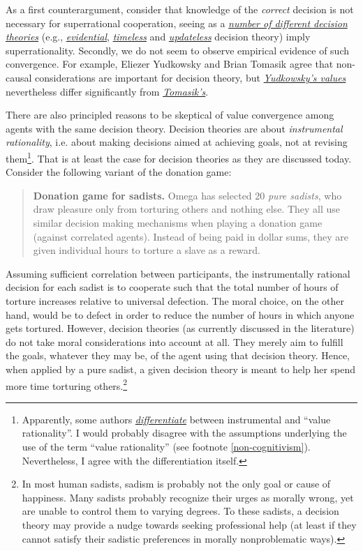 As a first counterargument, consider that knowledge of the
\emph{correct} decision is not necessary for superrational cooperation,
seeing as a
\href{https://casparoesterheld.com/a-comprehensive-list-of-decision-theories/}{\emph{number
of different decision theories}} (e.g.,
\href{https://en.wikipedia.org/wiki/Evidential_decision_theory}{\emph{evidential}},
\href{https://intelligence.org/files/TDT.pdf}{\emph{timeless}} and
\href{https://wiki.lesswrong.com/wiki/Updateless_decision_theory}{\emph{updateless}}
decision theory) imply superrationality. Secondly, we do not seem to
observe empirical evidence of such convergence. For example, Eliezer
Yudkowsky and Brian Tomasik agree that non-causal considerations are
important for decision theory, but
\href{https://wiki.lesswrong.com/wiki/Fun_theory}{\emph{Yudkowsky's
values}} nevertheless differ significantly from
\href{http://reducing-suffering.org/\#Ethics}{\emph{Tomasik's}}.

There are also principled reasons to be skeptical of value convergence
among agents with the same decision theory. Decision theories are about
\emph{instrumental rationality}, i.e. about making decisions aimed at
achieving goals, not at revising them\footnote{Apparently, some authors
  \href{https://en.wikipedia.org/wiki/Instrumental_and_value_rationality}{\emph{differentiate}}
  between instrumental and ``value rationality''. I would probably
  disagree with the assumptions underlying the use of the term ``value
  rationality'' (see footnote \ref{non-cognitivism}).
  Nevertheless, I agree with the differentiation itself.}. That is at
least the case for decision theories as they are discussed today.
Consider the following variant of the donation game:

\begin{quote}
\textbf{Donation game for sadists.} Omega has selected 20 \emph{pure
sadists}, who draw pleasure only from torturing others and nothing else.
They all use similar decision making mechanisms when playing a donation
game (against correlated agents). Instead of being paid in dollar sums,
they are given individual hours to torture a slave as a reward.
\end{quote}

Assuming sufficient correlation between participants, the instrumentally
rational decision for each sadist is to cooperate such that the total
number of hours of torture increases relative to universal defection.
The moral choice, on the other hand, would be to defect in order to
reduce the number of hours in which anyone gets tortured. However,
decision theories (as currently discussed in the literature) do not take
moral considerations into account at all. They merely aim to fulfill the
goals, whatever they may be, of the agent using that decision theory.
Hence, when applied by a pure sadist, a given decision theory is meant
to help her spend more time torturing others.\footnote{In most human
  sadists, sadism is probably not the only goal or cause of happiness.
  Many sadists probably recognize their urges as morally wrong, yet are
  unable to control them to varying degrees. To these sadists, a
  decision theory may provide a nudge towards seeking professional help
  (at least if they cannot satisfy their sadistic preferences in morally
  nonproblematic ways).}

